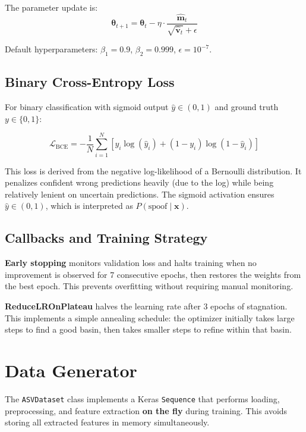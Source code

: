 \documentclass[12pt]{report}
\begin{document}
The parameter update is:
\begin{equation}
    \bm{\theta}_{t+1} = \bm{\theta}_t - \eta \cdot \frac{\hat{\bm{m}}_t}{\sqrt{\hat{\bm{v}}_t} + \epsilon}
\end{equation}

Default hyperparameters: $\beta_1 = 0.9$, $\beta_2 = 0.999$, $\epsilon = 10^{-7}$.

\subsection{Binary Cross-Entropy Loss}

For binary classification with sigmoid output $\hat{y} \in (0, 1)$ and ground truth $y \in \{0, 1\}$:

\begin{equation}
    \mathcal{L}_\text{BCE} = -\frac{1}{N} \sum_{i=1}^{N} \left[ y_i \log(\hat{y}_i) + (1 - y_i) \log(1 - \hat{y}_i) \right]
\end{equation}

This loss is derived from the negative log-likelihood of a Bernoulli distribution. It penalizes
confident wrong predictions heavily (due to the log) while being relatively lenient on uncertain
predictions. The sigmoid activation ensures $\hat{y} \in (0, 1)$, which is interpreted as
$P(\text{spoof} \mid \bm{x})$.

\subsection{Callbacks and Training Strategy}

\textbf{Early stopping} monitors validation loss and halts training when no improvement is
observed for 7 consecutive epochs, then restores the weights from the best epoch. This prevents
overfitting without requiring manual monitoring.

\textbf{ReduceLROnPlateau} halves the learning rate after 3 epochs of stagnation. This
implements a simple annealing schedule: the optimizer initially takes large steps to find a
good basin, then takes smaller steps to refine within that basin.

\section{Data Generator}

The \texttt{ASVDataset} class implements a Keras \texttt{Sequence} that performs loading,
preprocessing, and feature extraction \textbf{on the fly} during training. This avoids storing
all extracted features in memory simultaneously.
\end{document}
